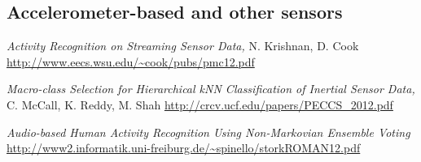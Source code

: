 \documentclass[letterpaper,12pt,fullpage]{article}
\begin{document}
\subsection{Accelerometer-based and other sensors}

{\it Activity Recognition on Streaming Sensor Data,}
N. Krishnan, D. Cook
\url{http://www.eecs.wsu.edu/~cook/pubs/pmc12.pdf}

{\it Macro-class Selection for Hierarchical kNN Classification of Inertial
Sensor Data,}
C. McCall, K. Reddy, M. Shah
\url{http://crcv.ucf.edu/papers/PECCS_2012.pdf}

{\it Audio-based Human Activity Recognition Using Non-Markovian Ensemble
Voting}
\url{http://www2.informatik.uni-freiburg.de/~spinello/storkROMAN12.pdf}



\end{document}
